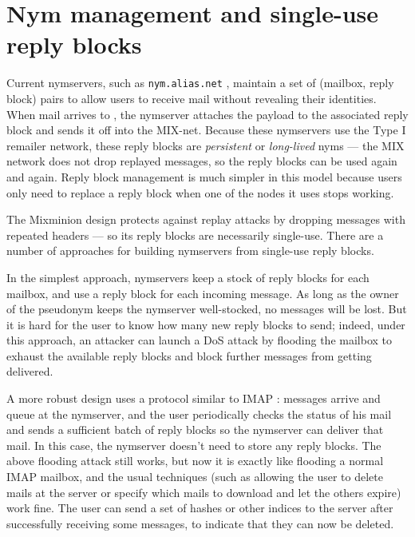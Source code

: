 \documentclass{llncs}
\newcommand\emailaddr{\begingroup \def\UrlLeft{<}\def\UrlRight{>}\urlstyle{tt}\Url}
\begin{document}


\section{Nym management and single-use reply blocks}
\label{sec:nymservers}

Current nymservers, such as {\tt nym.alias.net} \cite{nym-alias-net},
maintain a set of (mailbox, reply block) pairs to allow users to
receive mail without revealing their identities. When mail arrives to
\emailaddr{bob@nym.alias.net}, the nymserver attaches the payload to
the associated
reply block and sends it off into the MIX-net. Because these nymservers
use the Type I remailer network, these reply blocks are \emph{persistent}
or \emph{long-lived} nyms --- the MIX network does not drop replayed
messages, so the reply blocks can be used again and again. Reply block
management is much simpler in this model because users only need to
replace a reply block when one of the nodes it uses stops working.

The Mixminion design protects against replay attacks by dropping
messages with repeated headers --- so its reply blocks are necessarily
single-use. There are a number of approaches for building nymservers
from single-use reply blocks.

In the simplest approach, nymservers keep a stock of reply blocks for
each mailbox, and use a reply block for each incoming message. As long
as the owner of the pseudonym keeps the nymserver well-stocked, no
messages will be lost.  But it is hard for the user to know how many
new reply blocks to send; indeed, under this approach, an attacker can
launch a DoS attack by flooding the mailbox to exhaust the available
reply blocks and block further messages from getting delivered.

A more robust design uses a protocol similar to IMAP \cite{IMAP}:
messages arrive and queue at the nymserver, and the user periodically
checks the status of his mail and sends a sufficient batch of reply
blocks so the nymserver can deliver that mail. 
In this case, the nymserver doesn't need to store any reply blocks.
The above flooding attack still works, but now it is exactly
like flooding a normal IMAP mailbox, and the usual techniques (such as
allowing the user to delete mails at the server or specify which mails to
download and let the others expire) work fine. The user can send a set
of hashes or other indices to the server after successfully receiving
some messages, to indicate that they can now be deleted.
\end{document}
